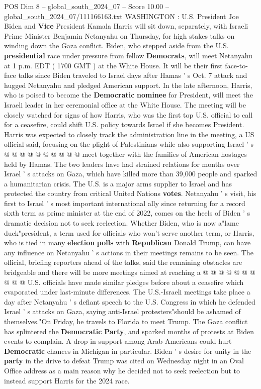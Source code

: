 \begin{textsample}{POS Dim 8 – global\_south\_2024\_07 – Score 10.00 – global\_south\_2024\_07/111166163.txt}  \label{ex:f8_pos_105}
WASHINGTON : U.S.
President Joe Biden and \textbf{Vice} President Kamala Harris will sit down, separately, with Israeli Prime Minister Benjamin Netanyahu on Thursday, for high stakes talks on winding down the Gaza conflict.
Biden, who stepped aside from the U.S. \textbf{presidential} race under pressure from fellow \textbf{Democrats}, will meet Netanyahu at 1 p.m.
EDT ( 1700 GMT ) at the White House.
It will be their first face-to-face talks since Biden traveled to Israel days after Hamas ' s Oct. 7 attack and hugged Netanyahu and pledged American support.
In the late afternoon, Harris, who is poised to become the \textbf{Democratic} \textbf{nominee} for President, will meet the Israeli leader in her ceremonial office at the White House.
The meeting will be closely watched for signs of how Harris, who was the first top U.S. official to call for a ceasefire, could shift U.S. policy towards Israel if she becomes President.
Harris was expected to closely track the administration line in the meeting, a US official said, focusing on the plight of Palestinians while also supporting Israel ' s @ @ @ @ @ @ @ @ @ @ meet together with the families of American hostages held by Hamas.
The two leaders have had strained relations for months over Israel ' s attacks on Gaza, which have killed more than 39,000 people and sparked a humanitarian crisis.
The U.S. is a major arms supplier to Israel and has protected the country from critical United Nations \textbf{votes}.
Netanyahu ' s visit, his first to Israel ' s most important international ally since returning for a record sixth term as prime minister at the end of 2022, comes on the heels of Biden ' s dramatic decision not to seek reelection.
Whether Biden, who is now a"lame duck"president, a term used for officials who won't serve another term, or Harris, who is tied in many \textbf{election} \textbf{polls} with \textbf{Republican} Donald Trump, can have any influence on Netanyahu ' s actions in their meetings remains to be seen.
The official, briefing reporters ahead of the talks, said the remaining obstacles are bridgeable and there will be more meetings aimed at reaching a @ @ @ @ @ @ @ @ @ @ U.S. officials have made similar pledges before about a ceasefire which evaporated under last-minute differences.
The U.S.-Israeli meetings take place a day after Netanyahu ' s defiant speech to the U.S.
Congress in which he defended Israel ' s attacks on Gaza, saying anti-Israel protesters"should be ashamed of themselves."On Friday, he travels to Florida to meet Trump.
The Gaza conflict has splintered the \textbf{Democratic} \textbf{Party}, and sparked months of protests at Biden events to complain.
A drop in support among Arab-Americans could hurt \textbf{Democratic} chances in Michigan in particular.
Biden ' s desire for unity in the \textbf{party} in the drive to defeat Trump was cited on Wednesday night in an Oval Office address as a main reason why he decided not to seek reelection but to instead support Harris for the 2024 race.

\end{textsample}
